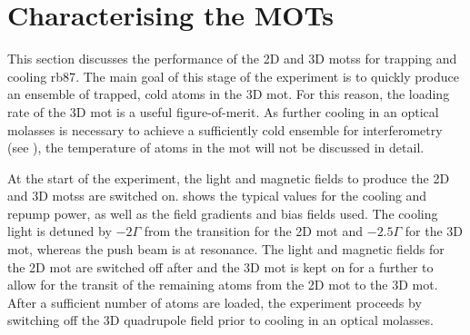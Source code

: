 \section{Characterising the MOTs}\label{sec:mot_characterisation}
This section discusses the performance of the 2D and 3D \acp{mots} for trapping
and cooling \ac{rb87}. The main goal of this stage of the experiment is to
quickly produce an ensemble of trapped, cold atoms in the 3D \ac{mot}. For this
reason, the loading rate of the 3D \ac{mot} is a useful figure-of-merit. As
further cooling in an optical molasses is necessary to achieve a sufficiently
cold ensemble for interferometry (see ), the
temperature of atoms in the \ac{mot} will not be discussed in detail.
\par\noindent

At the start of the experiment, the light and magnetic fields to produce the 2D
and 3D \acp{mots} are switched on.  shows the
typical values for the cooling and repump power, as well as the field gradients
and bias fields used. The cooling light is detuned by \(-2 \Gamma\) from the
 transition for the 2D \ac{mot} and \(-2.5 \Gamma\) for the 3D
\ac{mot}, whereas the push beam is at resonance. The light and magnetic fields
for the 2D \ac{mot} are switched off after  and the
3D \ac{mot} is kept on for a further  to allow for
the transit of the remaining atoms from the 2D \ac{mot} to the 3D \ac{mot}.
After a sufficient number of atoms are loaded, the experiment proceeds by
switching off the 3D quadrupole field prior to cooling in an optical molasses.
